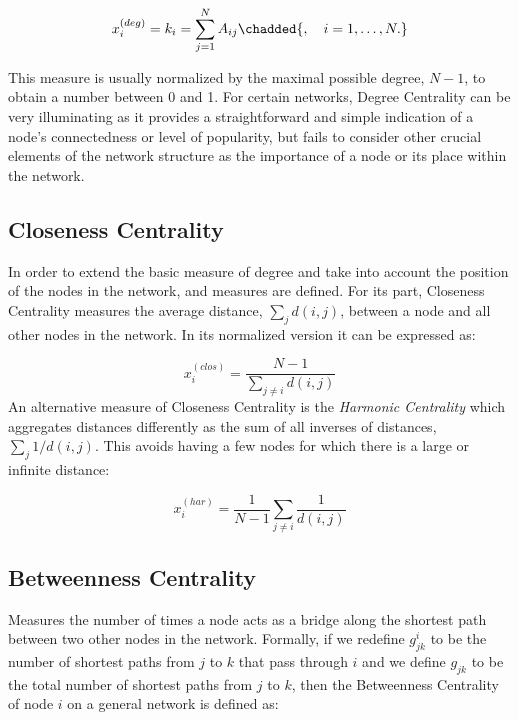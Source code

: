 \begin{equation}
    x_i^{(deg)}=k_i=\sum_{j=1}^{N}A_{ij} \chadded{, \quad i = 1,\dots,N.}
\end{equation}


This measure is usually normalized by the maximal possible degree, $N − 1$, to obtain a number between 0 and 1. For certain networks, Degree Centrality can be very illuminating as it provides a straightforward and simple indication of a node's connectedness or level of popularity, but fails to consider other crucial elements of the network structure  as the importance of a node or its place within the network.

\subsection*{Closeness Centrality} In order to extend the basic measure of degree and take into account the position of the nodes in the network,  and   measures are defined. For its part, Closeness Centrality measures the average distance, $\sum_{j}^{}d(i,j)$, between a node and all other nodes in the network. In its normalized version it can be expressed as:

\begin{equation}
    x_i^{(clos)}= \frac{N-1}{\sum_{j\ne i}^{}d(i,j)}
\end{equation}
An alternative measure of Closeness Centrality is the \textit{Harmonic Centrality} which aggregates distances differently as the sum of all inverses
of distances, $\sum_{j}^{}1/d(i,j)$. This avoids having a few nodes for which there is a large or infinite distance:

\begin{equation}
    x_i^{(har)}= \frac{1}{N-1}\sum_{j\ne i}^{}\frac{1}{d(i,j)}
\end{equation}

\subsection*{Betweenness Centrality} Measures the number of times a node acts as a bridge along the shortest path between two other nodes in the network. Formally, if we redefine $g_{jk}^i$ to be the number of shortest paths from $j$ to $k$ that pass through $i$ and we define $g_{jk}$ to be the total number of shortest paths from $j$ to $k$, then the Betweenness Centrality of node $i$ on a general network is defined as:

